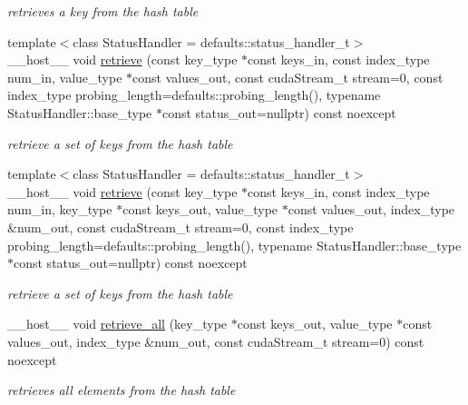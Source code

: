 \begin{DoxyCompactItemize}
\begin{DoxyCompactList}\small\item\em retrieves a key from the hash table \end{DoxyCompactList}\item 
{\footnotesize template$<$class Status\+Handler  = defaults\+::status\+\_\+handler\+\_\+t$>$ }\\\+\_\+\+\_\+host\+\_\+\+\_\+ void \hyperlink{classwarpcore_1_1SingleValueHashTable_a767c4754447a59c2c210e97f7e4d69ea}{retrieve} (const key\+\_\+type $\ast$const keys\+\_\+in, const index\+\_\+type num\+\_\+in, value\+\_\+type $\ast$const values\+\_\+out, const cuda\+Stream\+\_\+t stream=0, const index\+\_\+type probing\+\_\+length=defaults\+::probing\+\_\+length(), typename Status\+Handler\+::base\+\_\+type $\ast$const status\+\_\+out=nullptr) const noexcept
\begin{DoxyCompactList}\small\item\em retrieve a set of keys from the hash table \end{DoxyCompactList}\item 
{\footnotesize template$<$class Status\+Handler  = defaults\+::status\+\_\+handler\+\_\+t$>$ }\\\+\_\+\+\_\+host\+\_\+\+\_\+ void \hyperlink{classwarpcore_1_1SingleValueHashTable_af2cd9fb1f308a2fc945cb15b3729e30e}{retrieve} (const key\+\_\+type $\ast$const keys\+\_\+in, const index\+\_\+type num\+\_\+in, key\+\_\+type $\ast$const keys\+\_\+out, value\+\_\+type $\ast$const values\+\_\+out, index\+\_\+type \&num\+\_\+out, const cuda\+Stream\+\_\+t stream=0, const index\+\_\+type probing\+\_\+length=defaults\+::probing\+\_\+length(), typename Status\+Handler\+::base\+\_\+type $\ast$const status\+\_\+out=nullptr) const noexcept
\begin{DoxyCompactList}\small\item\em retrieve a set of keys from the hash table \end{DoxyCompactList}\item 
\+\_\+\+\_\+host\+\_\+\+\_\+ void \hyperlink{classwarpcore_1_1SingleValueHashTable_a8e6f7cce67f11b707a2a51dd3aa3efef}{retrieve\+\_\+all} (key\+\_\+type $\ast$const keys\+\_\+out, value\+\_\+type $\ast$const values\+\_\+out, index\+\_\+type \&num\+\_\+out, const cuda\+Stream\+\_\+t stream=0) const noexcept
\begin{DoxyCompactList}\small\item\em retrieves all elements from the hash table \end{DoxyCompactList}\item 

\end{DoxyCompactItemize}
